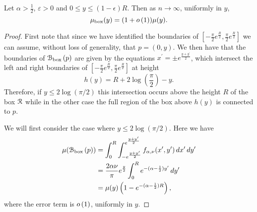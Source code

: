 \begin{lemma}\label{lem:average_degree_G_box}
Let $\alpha > \frac{1}{2}$, $\varepsilon >0$ and $0 \leq y \leq (1-\epsilon)R$. Then as $n \to \infty$, uniformly in $y$,
\[
	\mu_{\mathrm{box}}(y) = (1+o\left(1\right)) \mu(y).
\]
\end{lemma}

\begin{proof}
First note that since we have identified the boundaries of $[-\frac{\pi}{2}e^{\frac{R}{2}}, \frac{\pi}{2}e^{\frac{R}{2}}]$ we can assume, without loss of generality, that $p = (0,y)$. We then have that the boundaries of ${\mathcal B}_{\text{box}}\left(p\right)$ are given by the equations $x^\prime = \pm e^{\frac{y+y^\prime}{2}}$, which intersect the left and right boundaries of $[-\frac{\pi}{2}e^{\frac{R}{2}}, \frac{\pi}{2}e^{\frac{R}{2}}]$ at height
\[
	h(y) = R + 2 \log\left(\frac{\pi}{2}\right) - y.
\]
Therefore, if $y \le 2 \log(\pi/2)$ this intersection occurs above the height $R$ of the box ${\mathcal R}$ while in the other case the full region of the box above $h(y)$ is connected to $p$. 

We will first consider the case where $y \le 2 \log(\pi/2)$. Here we have
\begin{align*}
	\mu({\mathcal B}_{\text{box}}\left(p\right))
	&= \int_0^{R} \int_{-e^{\frac{y+y^\prime}{2}}}^{e^{\frac{y+y^\prime}{2}}} 
		f_{\alpha,\nu}(x^\prime,y^\prime) \, dx^\prime \, dy^\prime\\
	&= \frac{2 \alpha \nu}{\pi} e^{\frac{y}{2}} \int_0^{R} e^{-(\alpha - \frac{1}{2})y^\prime} \, dy^\prime\\
	&= \mu(y)\left(1 - e^{-(\alpha - \frac{1}{2})R}\right),
\end{align*}
where the error term is $o\left(1\right)$, uniformly in $y$.


\end{proof}
